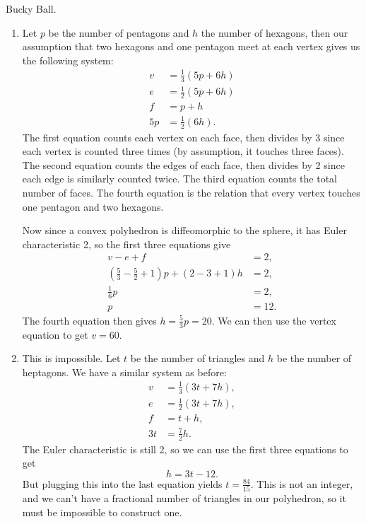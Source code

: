 \documentclass[twoside,10pt]{report}
\begin{document}
\newpage
\begin{exer}[]
Bucky Ball.
\end{exer}
\begin{enumerate}
	\item Let $p$ be the number of pentagons and $h$ the number of hexagons, then our assumption that two hexagons and one pentagon meet at each vertex gives us the following system:
		\begin{align*}
			v &= \frac{1}{3} (5p+6h)\\
			e &= \frac{1}{2} (5p+6h) \\
			f &= p+h\\
			5p&= \frac{1}{2} (6h).
		\end{align*}
		The first equation counts each vertex on each face, then divides by 3 since each vertex is counted three times (by assumption, it touches three faces). The second equation counts the edges of each face, then divides by 2 since each edge is similarly counted twice. The third equation counts the total number of faces. The fourth equation is the relation that every vertex touches one pentagon and two hexagons.

		Now since a convex polyhedron is diffeomorphic to the sphere, it has Euler characteristic 2, so the first three equations give
		\begin{align*}
			v - e + f &= 2,\\
			(\frac{5}{3} -\frac{5}{2} +1)p + (2-3+1)h &= 2,\\
			\frac{1}{6} p&=2, \\
			p&=12.
		\end{align*}
		The fourth equation then gives $h = \frac{5}{3} p = 20$. We can then use the vertex equation to get $v = 60$.

	\item This is impossible. Let $t$ be the number of triangles and $h$ be the number of heptagons. We have a similar system as before:
		\begin{align*}
			v&=\frac{1}{3} (3t+7h),\\
			e&=\frac{1}{2} (3t+7h),\\
			f&=t+h,\\
			3t&=\frac{7}{2} h.
		\end{align*}
		The Euler characteristic is still 2, so we can use the first three equations to get
		\[
		h=3t-12.
		\] But plugging this into the last equation yields
		$
		t=\frac{84}{15}.
		$ This is not an integer, and we can't have a fractional number of triangles in our polyhedron, so it must be impossible to construct one.
\end{enumerate}
\end{document}
